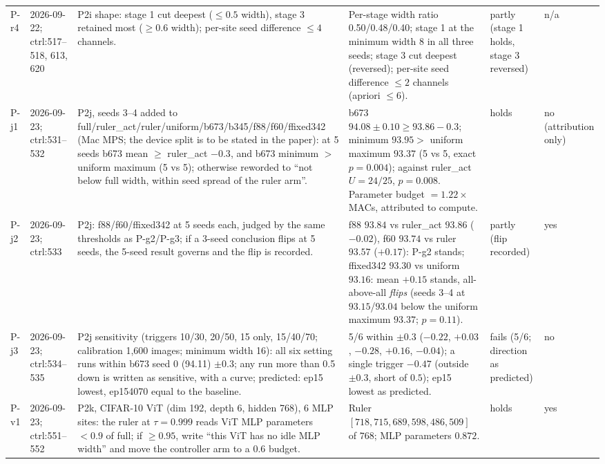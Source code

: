 \begin{longtable}{p{1.1cm}p{1.4cm}p{6.2cm}p{4.6cm}p{2.0cm}p{1.6cm}}
P-r4 & 2026-09-22; ctrl:517--518, 613, 620 & P2i shape: stage 1 cut deepest ($\le 0.5$ width), stage 3 retained most ($\ge 0.6$ width); per-site seed difference $\le 4$ channels. & Per-stage width ratio 0.50/0.48/0.40; stage 1 at the minimum width 8 in all three seeds; stage 3 cut deepest (reversed); per-site seed difference $\le 2$ channels (apriori $\le 6$). & partly (stage 1 holds, stage 3 reversed) & n/a \\
P-j1 & 2026-09-23; ctrl:531--532 & P2j, seeds 3--4 added to full/\allowbreak ruler\_act/\allowbreak ruler/\allowbreak uniform/\allowbreak b673/\allowbreak b345/\allowbreak f88/\allowbreak f60/\allowbreak ffixed342 (Mac MPS; the device split is to be stated in the paper): at 5 seeds b673 mean $\ge$ ruler\_act $- 0.3$, and b673 minimum $>$ uniform maximum (5 vs 5); otherwise reworded to ``not below full width, within seed spread of the ruler arm''. & b673 $94.08 \pm 0.10 \ge 93.86 - 0.3$; minimum $93.95 >$ uniform maximum $93.37$ (5 vs 5, exact $p = 0.004$); against ruler\_act $U = 24/25$, $p = 0.008$. Parameter budget $= 1.22\times$ MACs, attributed to compute. & holds & no (attribution only) \\
P-j2 & 2026-09-23; ctrl:533 & P2j: f88/f60/ffixed342 at 5 seeds each, judged by the same thresholds as P-g2/P-g3; if a 3-seed conclusion flips at 5 seeds, the 5-seed result governs and the flip is recorded. & f88 $93.84$ vs ruler\_act $93.86$ ($-0.02$), f60 $93.74$ vs ruler $93.57$ ($+0.17$): P-g2 stands; ffixed342 $93.30$ vs uniform $93.16$: mean $+0.15$ stands, all-above-all \emph{flips} (seeds 3--4 at $93.15$/$93.04$ below the uniform maximum $93.37$; $p = 0.11$). & partly (flip recorded) & yes \\
P-j3 & 2026-09-23; ctrl:534--535 & P2j sensitivity (triggers 10/30, 20/50, 15 only, 15/40/70; calibration 1,600 images; minimum width 16): all six setting runs within b673 seed 0 (94.11) $\pm 0.3$; any run more than 0.5 down is written as sensitive, with a curve; predicted: ep15 lowest, ep154070 equal to the baseline. & 5/6 within $\pm 0.3$ ($-0.22$, $+0.03$, $-0.28$, $+0.16$, $-0.04$); a single trigger $-0.47$ (outside $\pm 0.3$, short of $0.5$); ep15 lowest as predicted. & fails (5/6; direction as predicted) & no \\
P-v1 & 2026-09-23; ctrl:551--552 & P2k, CIFAR-10 ViT (dim 192, depth 6, hidden 768), 6 MLP sites: the ruler at $\tau=0.999$ reads ViT MLP parameters $< 0.9$ of full; if $\ge 0.95$, write ``this ViT has no idle MLP width'' and move the controller arm to a 0.6 budget. & Ruler $[718, 715, 689, 598, 486, 509]$ of $768$; MLP parameters $0.872$. & holds & yes \\

\end{longtable}
